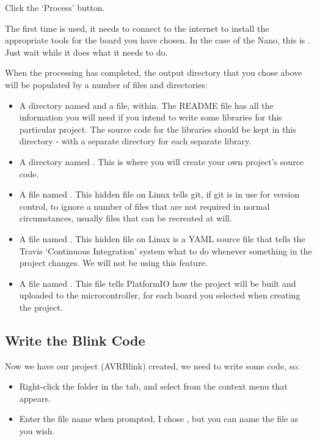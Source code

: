 Click the `Process' button.

The first time  is used, it needs to connect to the internet to install the appropriate tools for the board you have chosen. In the case of the Nano, this is . Just wait while it does what it needs to do.

When the processing has completed, the output directory that you chose
above will be populated by a number of files and directories:

\begin{itemize}
\item
  A directory named  and a file,  within.   The README file has all the information you will need if you intend to   write some libraries for this particular project. The source code for   the libraries should be kept in this directory - with a separate directory for each separate library.
\item
  A directory named . This is where you will create your own   project's source code.
\item
  A file named . This hidden file on Linux tells git, if git is in use for   version control, to ignore a number of files that are not required in   normal circumstances, usually files that can be recreated at will.
\item
  A file named . This hidden file on Linux is a YAML source file that   tells the Travis `Continuous Integration' system what to do whenever   something in the project changes. We will not be using this feature.
\item
  A file named . This file tells PlatformIO how the   project will be built and uploaded to the microcontroller, for each   board you selected when creating the project. 
\end{itemize}

\subsection{Write the Blink Code}\label{write-the-blink-code}

Now we have our project (AVRBlink) created, we need to write some code, so:

\begin{itemize}
\item
  Right-click the  folder in the  tab, and select    from the context menu that appears.
\item
  Enter the file name when prompted, I chose , but you can name   the file as you wish.
\end{itemize}

